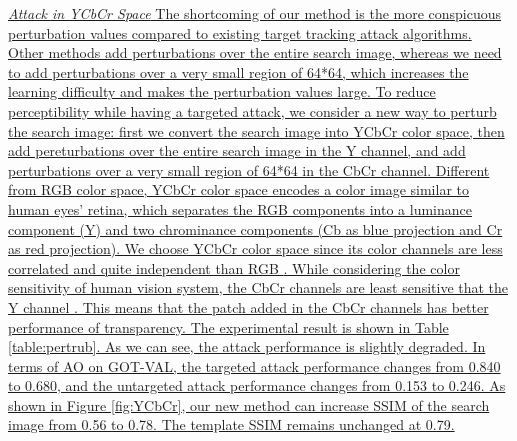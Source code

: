 \documentclass[journal]{IEEEtran}
\begin{document}
\uline{\textit{Attack in YCbCr Space}
The shortcoming of our method is the more conspicuous perturbation values compared to existing target tracking attack algorithms.
Other methods add perturbations over the entire search image, whereas we need to add perturbations over a very small region of 64*64, which increases the learning difficulty and makes the perturbation values large.
To reduce perceptibility while having a targeted attack, we consider a new way to perturb the search image: first we convert the search image into YCbCr color space, then add pereturbations over the entire search image in the Y channel, and add perturbations over a very small region of 64*64 in the CbCr channel.
Different from RGB color space, YCbCr color space encodes a color image similar to human eyes’ retina, which separates the RGB components into a luminance component (Y) and two chrominance components (Cb as blue projection and Cr as red projection).
We choose YCbCr color space since its color channels are less correlated and quite independent than RGB \cite{8630918}.
While considering the color sensitivity of human vision system, the CbCr channels are least sensitive that the Y channel \cite{8630918}. This means that the patch added in the CbCr channels has better performance of transparency.
The experimental result is shown in Table \ref{table:pertrub}. As we can see,
the attack performance is slightly degraded. In terms of AO on GOT-VAL, the targeted attack performance changes from 0.840 to 0.680, and the untargeted attack performance changes from 0.153 to 0.246.
As shown in Figure \ref{fig:YCbCr}, our new method can increase SSIM of the search image from 0.56 to 0.78. The template SSIM remains unchanged at 0.79.
}
\end{document}
